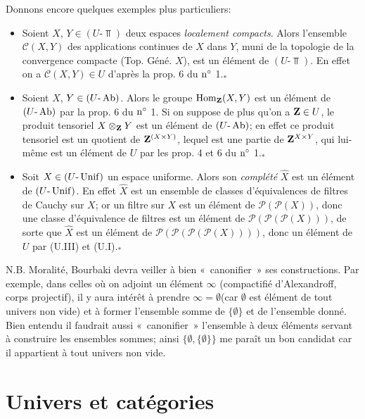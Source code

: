 \documentclass[10pt]{../fichiers-configuration-latex/smfart}
\begin{document}
Donnons encore quelques exemples plus particuliers:
\begin{itemize}
\item[* 1)] Soient $X$, $Y\in (U\text{-}\Top)$ deux espaces \emph{localement
compacts}. Alors l'ensemble $\mathscr{C}(X,Y)$ des applications
continues de $X$ dans $Y$, muni de la topologie de la convergence
compacte (Top. Géné. $X$), est un élément de $(U\text{-}\Top)$. En
effet on a $\mathscr{C}(X,Y)\in U$ d'après la prop. 6 du ${\rm
n^{\circ}}$ 1.${}_{\mbox{*}}$

\item[* 2)] Soient $X$, $Y\in (U\text{-}\operatorname{Ab})$. Alors le groupe
$\operatorname{Hom}_{\mathbf{Z}}(X,Y)$ est un élément de $(U\text{-}\operatorname{Ab})$ par la prop. 6
du ${\rm n^{\circ}}$ 1. Si on suppose de plus qu'on a $\mathbf{Z}\in U$, le
produit tensoriel $X\otimes_{\mathbf{Z}}Y$ est un élément de
$(U\text{-}\operatorname{Ab})$; en effet ce produit tensoriel est un quotient de
$\mathbf{Z}^{(X\times Y)}$, lequel est une partie de $\mathbf{Z}^{X\times Y}$, qui
lui-même est un élément de $U$ par les prop. 4 et 6 du ${\rm
n^{\circ}}$ 1.${}_{\mbox{*}}$

\item[* 3)] Soit $X\in (U\text{-}\operatorname{Unif})$ un espace uniforme. Alors son
\emph{complété} $\widehat{X}$ est un élément de $(U\text{-}\operatorname{Unif})$.
En effet $\widehat{X}$ est un ensemble de classes d'équivalences de
filtres de Cauchy sur $X$; or un filtre sur $X$ est un élément de
$\mathcal{P}(\mathcal{P}(X))$, donc une classe d'équivalence de
filtres est un élément de
$\mathcal{P}(\mathcal{P}(\mathcal{P}(X)))$, de sorte que
$\widehat{X}$ est un élément de
$\mathcal{P}(\mathcal{P}(\mathcal{P}(\mathcal{P}(X))))$, donc un
élément de $U$ par (U.III) et (U.I).${}_{\mbox{*}}$
\end{itemize}

N.B. Moralité, Bourbaki devra veiller à bien « canonifier » ses
constructions. Par exemple, dans celles où on adjoint un élément
$\infty$ (compactifié d'Alexandroff, corps projectif), il y aura
intérêt à prendre $\infty =∅$\pageoriginale (car
$∅$ est élément de tout univers non vide) et à former
l'ensemble somme de $\{∅\}$ et de l'ensemble donné. Bien
entendu il faudrait aussi « canonifier » l'ensemble à deux
éléments servant à construire les ensembles sommes; ainsi
$\{∅, \{∅\}\}$ me paraît un bon candidat car il
appartient à tout univers non vide.

\section{Univers et catégories}
\end{document}
